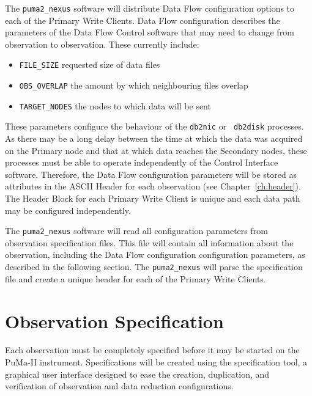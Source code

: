 The {\tt puma2\_nexus} software will distribute Data Flow configuration
options to each of the Primary Write Clients.  Data Flow configuration
describes the parameters of the Data Flow Control software that may
need to change from observation to observation.  These currently
include:
\begin{itemize}
\item{\tt FILE\_SIZE} requested size of data files
\item{\tt OBS\_OVERLAP} the amount by which neighbouring files overlap
\item{\tt TARGET\_NODES} the nodes to which data will be sent
\end{itemize}
These parameters configure the behaviour of the {\tt db2nic} or {\tt
db2disk} processes.  As there may be a long delay between the time at
which the data was acquired on the Primary node and that at which data
reaches the Secondary nodes, these processes must be able to operate
independently of the Control Interface software.  Therefore, the
Data Flow configuration parameters will be stored as attributes in the
ASCII Header for each observation (see Chapter~\ref{ch:header}).  The
Header Block for each Primary Write Client is unique and each data
path may be configured independently.

The {\tt puma2\_nexus} software will read all configuration parameters
from observation specification files.  This file will contain all
information about the observation, including the Data Flow
configuration configuration parameters, as described in the following
section.  The {\tt puma2\_nexus} will parse the specification file and
create a unique header for each of the Primary Write Clients.

\section{Observation Specification}

Each observation must be completely specified before it may be started
on the PuMa-II instrument.  Specifications will be created using the
specification tool, a graphical user interface designed to ease the
creation, duplication, and verification of observation and data
reduction configurations.

